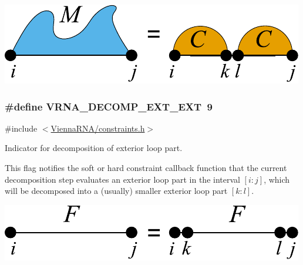  
\begin{DoxyImageNoCaption}
  \mbox{\includegraphics[width=\textwidth,height=\textheight/2,keepaspectratio=true]{decomp_ml_coaxial}}
\end{DoxyImageNoCaption}
\subsubsection[{\texorpdfstring{V\+R\+N\+A\+\_\+\+D\+E\+C\+O\+M\+P\+\_\+\+E\+X\+T\+\_\+\+E\+XT}{VRNA_DECOMP_EXT_EXT}}]{\setlength{\rightskip}{0pt plus 5cm}\#define V\+R\+N\+A\+\_\+\+D\+E\+C\+O\+M\+P\+\_\+\+E\+X\+T\+\_\+\+E\+XT~9}\hypertarget{group__constraints_ga437adf5115c1999304eff26b41e4c9b6}{}\label{group__constraints_ga437adf5115c1999304eff26b41e4c9b6}


{\ttfamily \#include $<$\hyperlink{constraints_8h}{Vienna\+R\+N\+A/constraints.\+h}$>$}



Indicator for decomposition of exterior loop part. 

This flag notifies the soft or hard constraint callback function that the current decomposition step evaluates an exterior loop part in the interval $[i:j]$, which will be decomposed into a (usually) smaller exterior loop part $[k:l]$.

 
\begin{DoxyImageNoCaption}
  \mbox{\includegraphics[width=\textwidth,height=\textheight/2,keepaspectratio=true]{decomp_ext_ext}}
\end{DoxyImageNoCaption}
